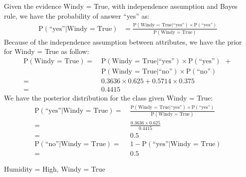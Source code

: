 \documentclass[12pt,twoside]{article}
\begin{document}
\begin{exercises}
\begin{exerciseparts}
  \ifsolution \solution{}
    Given the evidence Windy = True, with independence assumption
    and Bayes rule, we have the probability of answer ``yes'' as:
    \begin{equation*}
      \begin{aligned}
        \mbox{P}(\mbox{``yes''} | \mbox{Windy = True}) & = 
        \frac{\mbox{P}(\mbox{Windy = True} | \mbox{``yes''}) \times
        \mbox{P}(\mbox{``yes''})}{\mbox{P}(\mbox{Windy = True})}
      \end{aligned}
    \end{equation*}
    Because of the independence assumption between attributes, 
    we have the prior for Windy = True as follow:
    \begin{equation*}
      \begin{aligned}
        \mbox{P}(\mbox{Windy = True}) 
          = \ & \mbox{P}(\mbox{Windy = True}|\mbox{``yes''})  \times \mbox{P}(\mbox{``yes''})\ \ + \\
            & \mbox{P}(\mbox{Windy = True}|\mbox{``no''})  \times \mbox{P}(\mbox{``no''}) \\
          = \ & 0.3636 \times 0.625 + 0.5714 \times 0.375 \\
          = \ & 0.4415
      \end{aligned}
    \end{equation*}
    We have the posterior distribution for the class given Windy = True:
    \begin{equation*}
      \begin{aligned}
        \mbox{P}(\mbox{``yes''} | \mbox{Windy = True}) 
        = & \ \frac{\mbox{P}(\mbox{Windy = True} | \mbox{``yes''}) \times
        \mbox{P}(\mbox{``yes''})}{\mbox{P}(\mbox{Windy = True})} \\
        = & \ \frac{0.3636 \times 0.625}{0.4415} \\
        = & \ \boldsymbol{0.5} \\
        \mbox{P}(\mbox{``no''} | \mbox{Windy = True}) 
        = & \ 1 - \mbox{P}(\mbox{``yes''} | \mbox{Windy = True})  \\
        = & \ \boldsymbol{0.5}
      \end{aligned}
    \end{equation*}
  \fi

  \exercisepart Humidity = High, Windy = True


\end{exerciseparts}
\end{exercises}
\end{document}
